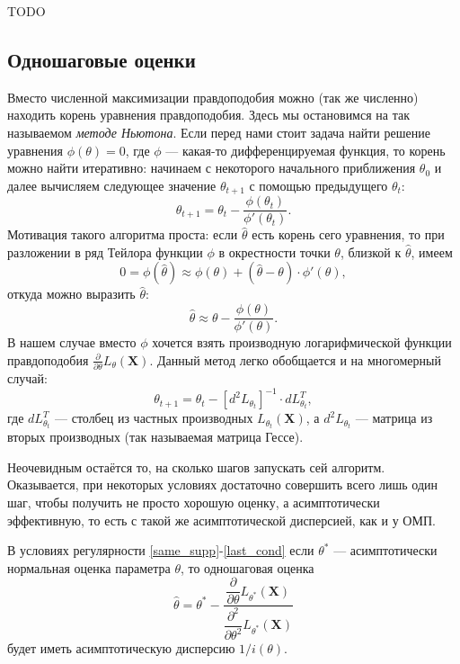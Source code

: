 TODO

\subsection{Одношаговые оценки}

Вместо численной максимизации правдоподобия можно (так же численно) находить корень уравнения правдоподобия. Здесь мы остановимся на так называемом \textit{методе Ньютона}. Если перед нами стоит задача найти решение уравнения $\phi(\theta) = 0$, где $\phi$ --- какая-то дифференцируемая функция, то корень можно найти итеративно: начинаем с некоторого начального приближения $\theta_0$ и далее вычисляем следующее значение $\theta_{t+1}$ с помощью предыдущего $\theta_{t}$:
\[
\theta_{t+1} = \theta_{t} - \frac{\phi(\theta_t)}{\phi'(\theta_t)}.
\]
Мотивация такого алгоритма проста: если $\widehat{\theta}$ есть корень сего уравнения, то при разложении в ряд Тейлора функции $\phi$ в окрестности точки $\theta$, близкой к $\widehat{\theta}$, имеем
\[
0 = \phi(\widehat{\theta}) \approx \phi(\theta) + (\widehat{\theta} - \theta) \cdot \phi'(\theta),
\]
откуда можно выразить $\widehat{\theta}$:
\[
\widehat{\theta} \approx \theta - \frac{\phi(\theta)}{\phi'(\theta)}.
\]
В нашем случае вместо $\phi$ хочется взять производную логарифмической функции правдоподобия $\frac{\partial}{\partial \theta} L_{\theta}(\mathbf X)$. Данный метод легко обобщается и на многомерный случай:
\[
\theta_{t+1} = \theta_{t} - [d^2L_{\theta_t}]^{-1} \cdot dL_{\theta_t}^T,
\]
где $dL_{\theta_t}^T$ --- столбец из частных производных $L_{\theta_t}(\mathbf X)$, а $d^2L_{\theta_t}$ --- матрица из вторых производных (так называемая матрица Гессе).

Неочевидным остаётся то, на сколько шагов запускать сей алгоритм. Оказывается, при некоторых условиях достаточно совершить всего лишь один шаг, чтобы получить не просто хорошую оценку, а асимптотически эффективную, то есть с такой же асимптотической дисперсией, как и у ОМП.
\begin{theorem}{}{}
    В условиях регулярности \ref{same_supp}-\ref{last_cond} если $\theta^*$ --- асимптотически нормальная оценка параметра $\theta$, то одношаговая оценка
    \[
    \widehat{\theta} = \theta^* - \frac{\dfrac{\partial}{\partial \theta} L_{\theta^*}(\mathbf X)}{\dfrac{\partial^2}{\partial \theta^2} L_{\theta^*}(\mathbf X)}
    \]
    будет иметь асимптотическую дисперсию $1/i(\theta)$.
\end{theorem}


